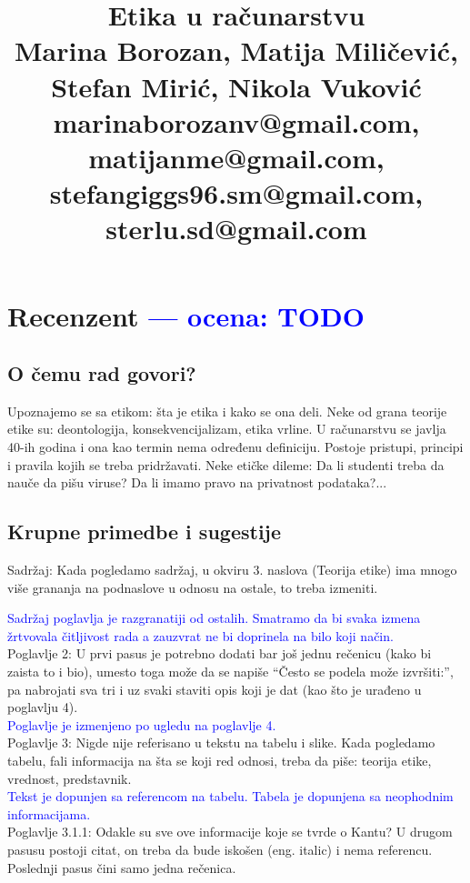 \documentclass[a4paper]{report}
\newcommand{\odgovor}[1]{\textcolor{blue}{#1}}
\begin{document}
\title{Etika u računarstvu\\ \small{
	Marina Borozan, Matija Miličević,\\
	Stefan Mirić, Nikola Vuković\\
	marinaborozanv@gmail.com, matijanme@gmail.com,\\
	stefangiggs96.sm@gmail.com, sterlu.sd@gmail.com
}}

\maketitle

\tableofcontents

\chapter{Recenzent \odgovor{--- ocena: TODO} }


\section{O čemu rad govori?}
Upoznajemo se sa etikom: šta je etika i kako se ona deli. Neke od grana teorije etike su: deontologija, konsekvencijalizam, etika vrline. U računarstvu se javlja 40-ih godina i ona kao termin nema određenu definiciju. Postoje pristupi, principi i pravila kojih se treba pridržavati. Neke etičke dileme: Da li studenti treba da nauče da pišu viruse? Da li imamo pravo na privatnost podataka?...

\section{Krupne primedbe i sugestije}
\textbullet Sadržaj: Kada pogledamo sadržaj, u okviru 3. naslova (Teorija etike) ima mnogo više grananja na podnaslove u odnosu na ostale, to treba izmeniti.

\odgovor{Sadržaj poglavlja je razgranatiji od ostalih. Smatramo da bi svaka izmena žrtvovala čitljivost rada a zauzvrat ne bi doprinela na bilo koji način. }
\\\textbullet Poglavlje 2: U prvi pasus je potrebno dodati bar još jednu rečenicu (kako bi zaista to i bio), umesto toga može da se napiše “Često se podela može izvršiti:”, pa nabrojati sva tri i uz svaki staviti opis koji je dat (kao što je urađeno u poglavlju 4). 
\\\odgovor{Poglavlje je izmenjeno po ugledu na poglavlje 4.}
\\\textbullet Poglavlje 3: Nigde nije referisano u tekstu na tabelu i slike. Kada pogledamo tabelu, fali informacija na šta se koji red odnosi, treba da piše: teorija etike, vrednost, predstavnik. 
\\\odgovor{Tekst je dopunjen sa referencom na tabelu. Tabela je dopunjena sa neophodnim informacijama. }
\\\textbullet Poglavlje 3.1.1: Odakle su sve ove informacije koje se tvrde o Kantu? U drugom pasusu postoji citat, on treba da bude iskošen (eng. italic) i nema referencu. Poslednji pasus čini samo jedna rečenica.
\end{document}
